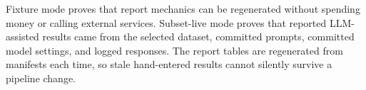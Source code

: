 \documentclass[10pt]{article}
\begin{document}
Fixture mode proves that report mechanics can be regenerated without spending
money or calling external services. Subset-live mode proves that reported
LLM-assisted results came from the selected dataset, committed prompts,
committed model settings, and logged responses. The report tables are
regenerated from manifests each time, so stale hand-entered results cannot
silently survive a pipeline change.
\end{document}
